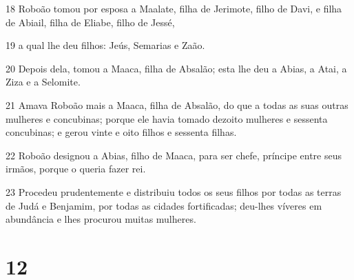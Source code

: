 \par 18 Roboão tomou por esposa a Maalate, filha de Jerimote, filho de Davi, e filha de Abiail, filha de Eliabe, filho de Jessé,
\par 19 a qual lhe deu filhos: Jeús, Semarias e Zaão.
\par 20 Depois dela, tomou a Maaca, filha de Absalão; esta lhe deu a Abias, a Atai, a Ziza e a Selomite.
\par 21 Amava Roboão mais a Maaca, filha de Absalão, do que a todas as suas outras mulheres e concubinas; porque ele havia tomado dezoito mulheres e sessenta concubinas; e gerou vinte e oito filhos e sessenta filhas.
\par 22 Roboão designou a Abias, filho de Maaca, para ser chefe, príncipe entre seus irmãos, porque o queria fazer rei.
\par 23 Procedeu prudentemente e distribuiu todos os seus filhos por todas as terras de Judá e Benjamim, por todas as cidades fortificadas; deu-lhes víveres em abundância e lhes procurou muitas mulheres.

\chapter{12}

